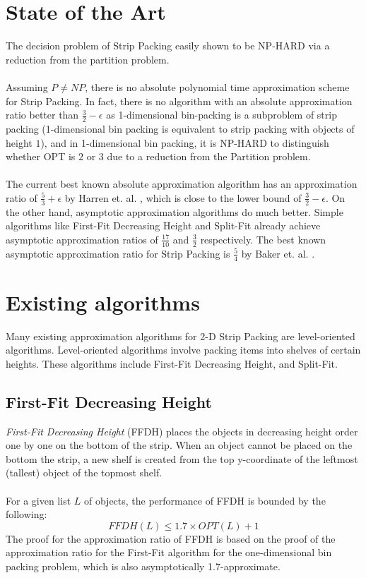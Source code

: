 \documentclass{article}
\begin{document}
\section{State of the Art}
The decision problem of Strip Packing easily shown to be NP-HARD via a reduction from the partition problem.\\
\\
Assuming $P \neq NP$, there is no absolute polynomial time approximation scheme for Strip Packing. In fact, there is no algorithm with an absolute approximation ratio better than $\frac{3}{2} - \epsilon$ as 1-dimensional bin-packing is a subproblem of strip packing (1-dimensional bin packing is equivalent to strip packing with objects of height $1$), and in 1-dimensional bin packing, it is NP-HARD to distinguish whether OPT is $2$ or $3$ due to a reduction from the Partition problem.\\
\\
The current best known absolute approximation algorithm has an approximation ratio of $\frac{5}{3} + \epsilon$ by Harren et. al. \cite{harren1}, which is close to the lower bound of $\frac{3}{2} - \epsilon$. On the other hand, asymptotic approximation algorithms do much better. Simple algorithms like First-Fit Decreasing Height and Split-Fit already achieve asymptotic approximation ratios of $\frac{17}{10}$ and $\frac{3}{2}$ respectively. The best known asymptotic approximation ratio for Strip Packing is $\frac{5}{4}$ by Baker et. al.  \cite{baker1}.\\

\section{Existing algorithms}
Many existing approximation algorithms for 2-D Strip Packing are level-oriented algorithms. Level-oriented algorithms involve packing items into shelves of certain heights. These algorithms include First-Fit Decreasing Height, and Split-Fit.
\subsection{First-Fit Decreasing Height}
\textit{First-Fit Decreasing Height} (FFDH) places the objects in decreasing height order one by one on the bottom of the strip. When an object cannot be placed on the bottom the strip, a new shelf is created from the top y-coordinate of the leftmost (tallest) object of the topmost shelf.\\
\\
For a given list $L$ of objects, the performance of FFDH is bounded by the following:
\[
	FFDH(L) \leq 1.7 \times OPT(L) + 1
\]
The proof for the approximation ratio of FFDH is based on the proof of the approximation ratio for the First-Fit algorithm for the one-dimensional bin packing problem, which is also asymptotically 1.7-approximate.
\end{document}
